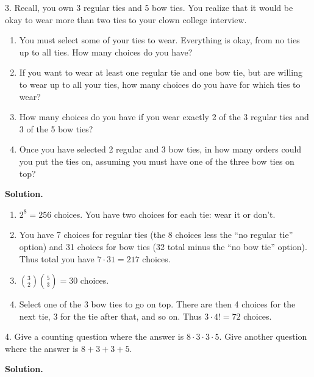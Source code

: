 \documentclass[10pt,]{book}
\theoremstyle{plain}
\theoremstyle{definition}
\theoremstyle{definition}
\theoremstyle{definition}
\numberwithin{equation}{section}
\begin{document}
\begin{exerciselist}
\item[3.]\hypertarget{exercise-104}{}
            Recall, you own 3 regular ties and 5 bow ties. You realize that it would be okay to wear more than two ties to your clown college interview.
          \leavevmode%
\begin{enumerate}[label=(\alph*)]
\item\hypertarget{li-719}{}
                You must select some of your ties to wear. Everything is okay, from no ties up to all ties. How many choices do you have?
\item\hypertarget{li-720}{}
                If you want to wear at least one regular tie and one bow tie, but are willing to wear up to all your ties, how many choices do you have for which ties to wear?
\item\hypertarget{li-721}{}
                How many choices do you have if you wear exactly 2 of the 3 regular ties and 3 of the 5 bow ties?
\item\hypertarget{li-722}{}
                Once you have selected 2 regular and 3 bow ties, in how many orders could you put the ties on, assuming you must have one of the three bow ties on top?
\end{enumerate}

\par\smallskip
\par\smallskip
\noindent\textbf{Solution.}\hypertarget{solution-155}{}\quad
 \leavevmode%
\begin{enumerate}[label=(\alph*)]
\item\hypertarget{li-723}{}\(2^8 = 256\) choices. You have two choices for each tie: wear it or don't.%
\item\hypertarget{li-724}{}
                You have 7 choices for regular ties (the 8 choices less the ``no regular tie'' option) and 31 choices for bow ties (32 total minus the ``no bow tie'' option). Thus total you have \(7 \cdot 31 = 217\) choices.
\item\hypertarget{li-725}{}\({3\choose 2}{5\choose 3} = 30\) choices.%
\item\hypertarget{li-726}{}
                Select one of the 3 bow ties to go on top. There are then 4 choices for the next tie, 3 for the tie after that, and so on. Thus \(3\cdot 4! = 72\) choices.
\end{enumerate}

%
\item[4.]\hypertarget{exercise-105}{}
            Give a counting question where the answer is \(8\cdot 3 \cdot 3 \cdot 5\). Give another question where the answer is \(8 + 3 + 3 + 5\).
\par\smallskip
\par\smallskip
\noindent\textbf{Solution.}\hypertarget{solution-156}{}\quad


\end{exerciselist}
\end{document}
